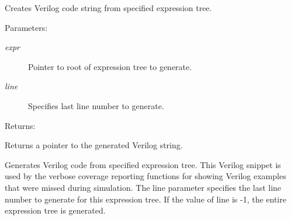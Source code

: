 Creates Verilog code string from specified expression tree.

\begin{Desc}
\item[Parameters: ]\par
\begin{description}
\item[{\em 
expr}]Pointer to root of expression tree to generate. \item[{\em 
line}]Specifies last line number to generate.\end{description}
\end{Desc}
\begin{Desc}
\item[Returns: ]\par
Returns a pointer to the generated Verilog string.\end{Desc}
Generates Verilog code from specified expression tree. This Verilog snippet is used by the verbose coverage reporting functions for showing Verilog examples that were missed during simulation. The line parameter specifies the last line number to generate for this expression tree. If the value of line is -1, the entire expression tree is generated. 